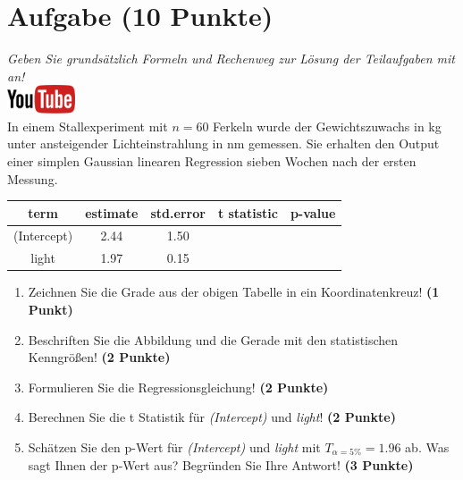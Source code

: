 \documentclass[a4paper, 9pt]{scrartcl}\usepackage[]{graphicx}\usepackage[]{xcolor}
\begin{document}
\section{Aufgabe \hfill (10 Punkte)}

\textit{Geben Sie grunds{\"a}tzlich Formeln und Rechenweg zur L{\"o}sung der
  Teilaufgaben mit an!} \\[1Ex]

\hfill\href{https://youtu.be/lJp8rFmMnrs}{\includegraphics[width =
  2cm]{img/youtube}}\\[1Ex]



In einem Stallexperiment mit $n = 60$ Ferkeln wurde der
Gewichtszuwachs in kg unter ansteigender Lichteinstrahlung in nm
gemessen. Sie erhalten den \Rlogo Output einer simplen Gaussian linearen
Regression sieben Wochen nach der ersten Messung.

\begin{table}[!h]
\centering\begingroup\fontsize{14}{16}\selectfont

\begin{tabular}{ccccc}
\toprule
term & estimate & std.error & t statistic & p-value\\
\midrule
(Intercept) & 2.44 & 1.50 &  & \\
light & 1.97 & 0.15 &  & \\
\bottomrule
\end{tabular}
\endgroup{}
\end{table}



\begin{enumerate}
\item Zeichnen Sie die Grade aus der obigen Tabelle in ein Koordinatenkreuz! \textbf{(1 Punkt)}
\item Beschriften Sie die Abbildung und die Gerade mit den statistischen
  Kenngr{\"o}{\ss}en! \textbf{(2 Punkte)}
\item Formulieren Sie die Regressionsgleichung! \textbf{(2 Punkte)}
\item Berechnen Sie die t Statistik f{\"u}r \textit{(Intercept)} und
  \textit{light}! \textbf{(2 Punkte)}
\item Sch{\"a}tzen Sie den p-Wert f{\"u}r \textit{(Intercept)} und
  \textit{light} mit $T_{\alpha = 5\%} = 1.96$ ab. Was sagt Ihnen der p-Wert aus?
  Begr{\"u}nden Sie Ihre Antwort! \textbf{(3 Punkte)}
\end{enumerate} 
\clearpage
\end{document}

